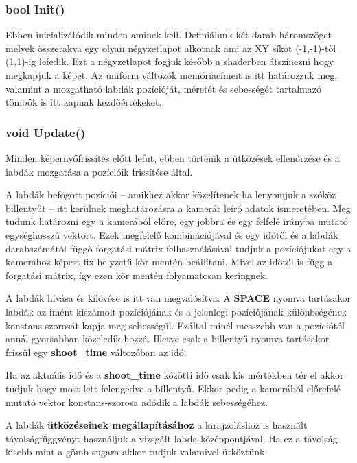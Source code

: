 \subsubsection{bool Init()}

Ebben inicializálódik minden aminek kell. Definiálunk két darab háromszöget melyek összerakva egy olyan négyzetlapot alkotnak ami az XY síkot (-1,-1)-től (1,1)-ig lefedik. Ezt a négyzetlapot fogjuk később a shaderben átszínezni hogy megkapjuk a képet. Az uniform változók memóriacímeit is itt határozzuk meg, valamint a mozgatható labdák pozícióját, méretét és sebességét tartalmazó tömbök is itt kapnak kezdőértékeket.

\subsubsection{void Update()}

Minden képernyőfrissítés előtt lefut, ebben történik a ütközések ellenőrzése és a labdák mozgatása a pozícióik frissítése által. 

A labdák befogott pozíciói -- amikhez akkor közelítenek ha lenyomjuk a szóköz billentyűt -- itt kerülnek meghatározásra a kamerát leíró adatok ismeretében. Meg tudunk határozni egy a kamerából előre, egy jobbra és egy felfelé irányba mutató egységhosszú vektort. Ezek megfelelő kombinációjával és egy időtől és a labdák darabszámától függő forgatási mátrix felhasználásával tudjuk a pozíciójukat egy a kamerához képest fix helyzetű kör mentén beállítani. Mivel az időtől is függ a forgatási mátrix, így ezen kör mentén folyamatosan keringnek.

A labdák hívása és kilövése is itt van megvalósítva. A \textbf{SPACE} nyomva tartásakor labdák az imént kiszámolt pozíciójának és a jelenlegi pozíciójának különbségének konstans-szorosát kapja meg sebességül. Ezáltal minél messzebb van a pozíciótól annál gyorsabban közeledik hozzá. Illetve csak a billentyű nyomva tartásakor frissül egy \textbf{shoot\_time} változóban az idő. 

Ha az aktuális idő és a \textbf{shoot\_time} közötti idő csak kis mértékben tér el akkor tudjuk hogy most lett felengedve a billentyű. Ekkor pedig a kamerából előrefelé mutató vektor konstans-szorosa adódik a labdák sebességéhez.

A labdák \textbf{ütközéseinek megállapításához} a kirajzoláshoz is használt távolságfüggvényt használjuk a vizsgált labda középpontjával. Ha ez a távolság kisebb mint a gömb sugara akkor tudjuk valamivel ütköztünk.

